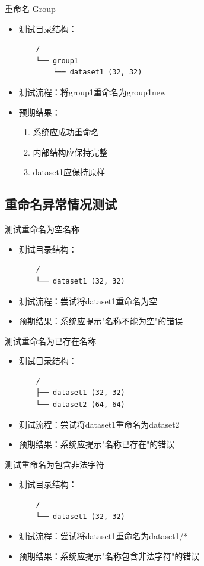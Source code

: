 \documentclass[a4paper,12pt]{report}	%
\begin{document}
重命名 Group
\begin{itemize}
    \item 测试目录结构：
    \begin{verbatim}
    /
    └── group1
        └── dataset1 (32, 32)
    \end{verbatim}
    \item 测试流程：将group1重命名为group1\textunderscore new
    \item 预期结果：
    \begin{enumerate}
        \item 系统应成功重命名
        \item 内部结构应保持完整
        \item dataset1应保持原样
    \end{enumerate}
\end{itemize}

\subsection{重命名异常情况测试}
测试重命名为空名称
\begin{itemize}
    \item 测试目录结构：
    \begin{verbatim}
    /
    └── dataset1 (32, 32)
    \end{verbatim}
    \item 测试流程：尝试将dataset1重命名为空
    \item 预期结果：系统应提示"名称不能为空"的错误
\end{itemize}

测试重命名为已存在名称
\begin{itemize}
    \item 测试目录结构：
    \begin{verbatim}
    /
    ├── dataset1 (32, 32)
    └── dataset2 (64, 64)
    \end{verbatim}
    \item 测试流程：尝试将dataset1重命名为dataset2
    \item 预期结果：系统应提示"名称已存在"的错误
\end{itemize}

测试重命名为包含非法字符
\begin{itemize}
    \item 测试目录结构：
    \begin{verbatim}
    /
    └── dataset1 (32, 32)
    \end{verbatim}
    \item 测试流程：尝试将dataset1重命名为dataset1/*
    \item 预期结果：系统应提示"名称包含非法字符"的错误
\end{itemize}
\end{document}
